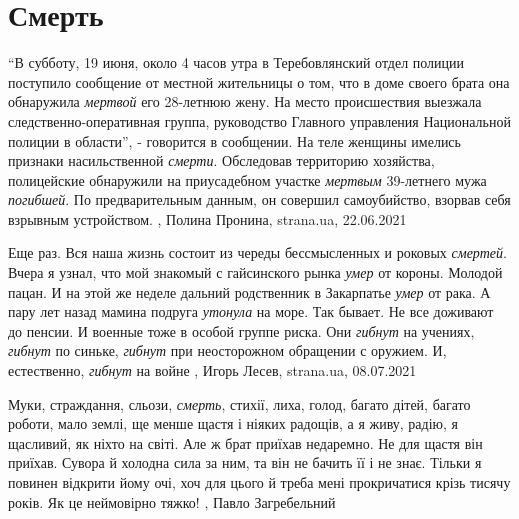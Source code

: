  
 
 
 
 
\chapter{Смерть}
\label{sec:slova.smert}

\enquote{В субботу, 19 июня, около 4 часов утра в Теребовлянский отдел полиции
поступило сообщение от местной жительницы о том, что в доме своего брата она
обнаружила \emph{мертвой} его 28-летнюю жену. На место происшествия выезжала
следственно-оперативная группа, руководство Главного управления Национальной
полиции в области}, - говорится в сообщении.  На теле женщины имелись признаки
насильственной \emph{смерти}. Обследовав территорию хозяйства, полицейские обнаружили
на приусадебном участке \emph{мертвым} 39-летнего мужа \emph{погибшей}. По предварительным
данным, он совершил самоубийство, взорвав себя взрывным устройством.
, Полина Пронина, strana.ua, 22.06.2021

Еще раз. Вся наша жизнь состоит из череды бессмысленных и роковых \emph{смертей}.
Вчера я узнал, что мой знакомый с гайсинского рынка \emph{умер} от короны. Молодой
пацан. И на этой же неделе дальний родственник в Закарпатье \emph{умер} от рака. А
пару лет назад мамина подруга \emph{утонула} на море. Так бывает. Не все доживают до
пенсии.  И военные тоже в особой группе риска. Они \emph{гибнут} на учениях, \emph{гибнут} по
синьке, \emph{гибнут} при неосторожном обращении с оружием. И, естественно, \emph{гибнут} на
войне
, 
Игорь Лесев, strana.ua, 08.07.2021

Муки, страждання, сльози, \emph{смерть}, стихії, лиха, голод, багато дітей, багато
роботи, мало землі, ще менше щастя і ніяких радощів, а я живу, радію, я
щасливий, як ніхто на світі.  Але ж брат приїхав недаремно. Не для щастя він
приїхав. Сувора й холодна сила за ним, та він не бачить її і не знає. Тільки я
повинен відкрити йому очі, хоч для цього й треба мені прокричатися крізь тисячу
років.  Як це неймовірно тяжко!
, Павло Загребельний 

